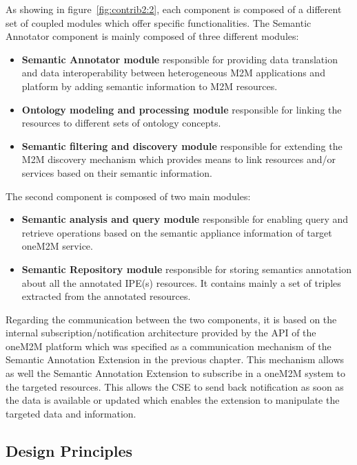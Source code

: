 As showing in figure~\ref{fig:contrib2:2}, each component is composed of a different set of coupled modules which offer specific functionalities. The Semantic Annotator component is mainly composed of three different modules:
\begin{itemize}
\item \textbf{Semantic Annotator module} responsible for providing data translation and data interoperability between heterogeneous M2M applications and platform by adding semantic information to M2M resources.
\item \textbf{Ontology modeling and processing module} responsible for linking the resources to different sets of ontology concepts.
\item \textbf{Semantic filtering and discovery module} responsible for extending the M2M discovery mechanism which provides means to link resources and/or services based on their semantic information. 
\end{itemize}\par 

The second component is composed of two main modules:
\begin{itemize}
\item \textbf{Semantic analysis and query module} responsible for enabling query and retrieve operations based on the semantic appliance information of target oneM2M service.
\item \textbf{Semantic Repository module} responsible for storing semantics annotation about all the annotated IPE(s) resources. It contains mainly a set of triples extracted from the annotated resources.
\end{itemize}
Regarding the communication between the two components, it is based on the internal subscription/notification architecture provided by the API of the oneM2M platform which was specified as a communication mechanism of the Semantic Annotation Extension in the previous chapter. This mechanism allows as well the Semantic Annotation Extension to subscribe in a oneM2M system to the targeted resources. This allows the CSE to send back notification as soon as the data is available or updated which enables the extension to manipulate the targeted data and information. \par

\subsection{Design Principles}

